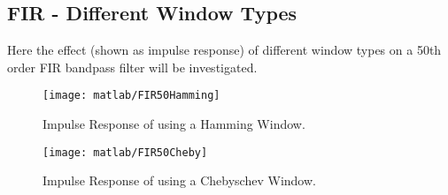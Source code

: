 \clearpage

\subsection{FIR - Different Window Types}
Here the effect (shown as impulse response) of different window types on a 50th order FIR bandpass filter will be investigated.

\begin{figure}[!htb]
	\centering
	\texttt{[image: matlab/FIR50Hamming]}
	\caption{Impulse Response of using a Hamming Window.}
	\label{fig:FIR_50Hamming}
\end{figure}

\begin{figure}[!htb]
	\centering
	\texttt{[image: matlab/FIR50Cheby]}
	\caption{Impulse Response of using a Chebyschev Window.}
	\label{fig:FIR_50Cheby}
\end{figure}
